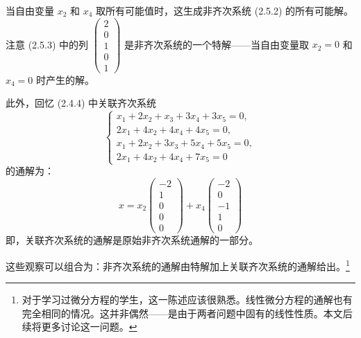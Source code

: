 当自由变量 \(x_{2}\) 和 \(x_{4}\) 取所有可能值时，这生成非齐次系统 (2.5.2) 的所有可能解。注意 (2.5.3) 中的列 \(\begin{pmatrix} 2 \\ 0 \\ 1 \\ 0 \\ 1 \end{pmatrix}\) 是非齐次系统的一个特解——当自由变量取 \(x_{2}=0\) 和 \(x_{4}=0\) 时产生的解。

此外，回忆 (2.4.4) 中关联齐次系统
\[
\begin{cases}
x_{1} + 2x_{2} + x_{3} + 3x_{4} + 3x_{5} = 0, \\
2x_{1} + 4x_{2} + 4x_{4} + 4x_{5} = 0, \\
x_{1} + 2x_{2} + 3x_{3} + 5x_{4} + 5x_{5} = 0, \\
2x_{1} + 4x_{2} + 4x_{4} + 7x_{5} = 0
\end{cases}
\]
的通解为：
\[
x = x_{2} \begin{pmatrix} -2 \\ 1 \\ 0 \\ 0 \\ 0 \end{pmatrix} +
x_{4} \begin{pmatrix} -2 \\ 0 \\ -1 \\ 1 \\ 0 \end{pmatrix}
\]
即，关联齐次系统的通解是原始非齐次系统通解的一部分。

这些观察可以组合为：非齐次系统的通解由特解加上关联齐次系统的通解给出。\footnote{对于学习过微分方程的学生，这一陈述应该很熟悉。线性微分方程的通解也有完全相同的情况。这并非偶然——是由于两者问题中固有的线性性质。本文后续将更多讨论这一问题。}

